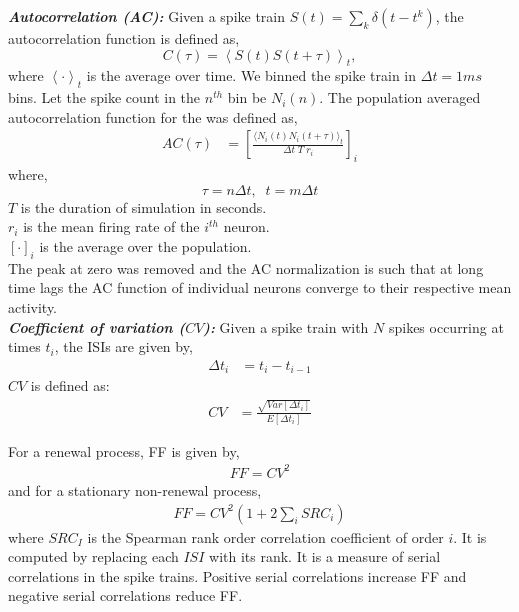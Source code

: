 \textbf{\textit{Autocorrelation (AC):}}
Given a spike train $S(t) = \sum_{k} \delta(t - t^k)$, the 
autocorrelation function is defined as, \\
\begin{equation}
C(\tau) = \left\langle S(t) S(t + \tau) \right\rangle _ {t},
\end{equation}
where $\left\langle \cdot \right\rangle _ {t}$ is the average over time. 
We binned the spike train in $\Delta t = 1ms$ bins. Let the spike count in the $n^{th}$ bin be $N_{i}(n)$. The population averaged autocorrelation function for the was defined as, \\
\begin{align}
AC(\tau) &= \left[ \frac{\langle N_{i}(t)N_{i}(t + \tau) \rangle_t}{\Delta t \; T \; r_{i}} \right]_i
\end{align}
where,\\
\begin{equation}
\tau = n \Delta t,\;\; t = m \Delta t
\end{equation}
$T$ is the duration of simulation in seconds.\\
$r_i$ is the mean firing rate of the $i^{th}$ neuron. \\
$\left[ \cdot \right]_i$ is the average over the population. \\
The peak at zero was removed and the AC normalization is such that at long time lags the AC function of individual neurons converge to their respective mean activity. \\


\textbf{\textit{Coefficient of variation ($CV$):}}
Given a spike train with $N$ spikes occurring at times $t_{i}$, the ISIs are given by, \\
\begin{align}
\Delta t_{i} &= t_{i} - t_{i-1}
\end{align}
$CV$ is defined as: \\
\begin{align}
CV &= \frac{\sqrt{Var[\Delta t_{i}]}}{E[\Delta t_{i}]}
\end{align}

For a renewal process, FF is given by, 
\begin{align}
FF = CV^{2}
\end{align}
and for a stationary non-renewal process, 
\begin{align}
FF = CV^{2} (1 + 2 \sum_{i} SRC_{i})
\label{ffcveq}
\end{align}
where $SRC_I$ is the Spearman rank order correlation coefficient of order $i$. It is computed by replacing each $ISI$ with its rank. It is a measure of serial correlations in the spike trains. Positive serial correlations increase FF and negative serial correlations reduce FF.   \\

